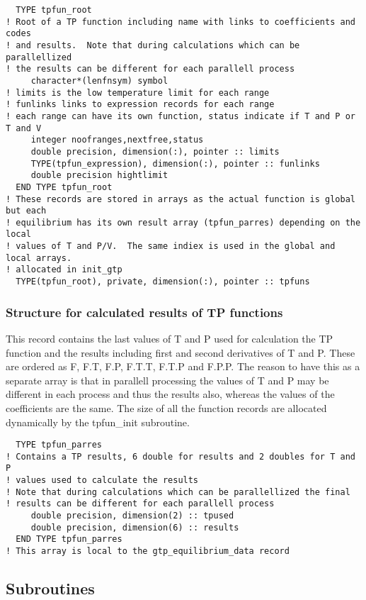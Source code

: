 \documentclass[12pt]{article}
\begin{document}
\begin{verbatim}
  TYPE tpfun_root
! Root of a TP function including name with links to coefficients and codes
! and results.  Note that during calculations which can be parallellized
! the results can be different for each parallell process
     character*(lenfnsym) symbol
! limits is the low temperature limit for each range
! funlinks links to expression records for each range
! each range can have its own function, status indicate if T and P or T and V
     integer noofranges,nextfree,status
     double precision, dimension(:), pointer :: limits
     TYPE(tpfun_expression), dimension(:), pointer :: funlinks
     double precision hightlimit
  END TYPE tpfun_root
! These records are stored in arrays as the actual function is global but each
! equilibrium has its own result array (tpfun_parres) depending on the local
! values of T and P/V.  The same indiex is used in the global and local arrays.
! allocated in init_gtp
  TYPE(tpfun_root), private, dimension(:), pointer :: tpfuns
\end{verbatim}

\subsubsection{Structure for calculated results of TP functions}

This record contains the last values of T and P used for calculation
the TP function and the results including first and second derivatives
of T and P.  These are ordered as F, F.T, F.P, F.T.T, F.T.P and F.P.P.
The reason to have this as a separate array is that in parallell
processing the values of T and P may be different in each process and
thus the results also, whereas the values of the coefficients are the
same.  The size of all the function records are allocated dynamically
by the tpfun\_init subroutine.

\begin{verbatim}
  TYPE tpfun_parres
! Contains a TP results, 6 double for results and 2 doubles for T and P
! values used to calculate the results
! Note that during calculations which can be parallellized the final
! results can be different for each parallell process
     double precision, dimension(2) :: tpused
     double precision, dimension(6) :: results
  END TYPE tpfun_parres
! This array is local to the gtp_equilibrium_data record
\end{verbatim}

\subsection{Subroutines}
\end{document}
